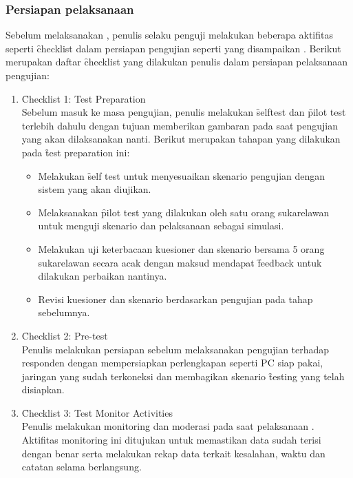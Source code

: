 \subsubsection{Persiapan pelaksanaan \ust}
Sebelum melaksanakan \ust, penulis selaku penguji melakukan beberapa aktifitas seperti \f{checklist} dalam persiapan pengujian seperti yang disampaikan \citet{buku.rubin}. Berikut merupakan daftar \f{checklist} yang dilakukan penulis dalam persiapan pelaksanaan pengujian:
\begin{enumerate}
	\item \f{Checklist 1: Test Preparation}\\
	Sebelum masuk ke masa pengujian, penulis melakukan \f{selftest} dan \f{pilot test} terlebih dahulu dengan tujuan memberikan gambaran pada saat pengujian yang akan dilaksanakan nanti. Berikut merupakan tahapan yang dilakukan pada \f{test preparation} ini:
	\begin{itemize}
		\item Melakukan \f{self test} untuk menyesuaikan skenario pengujian dengan sistem yang akan diujikan.
		\item Melaksanakan \f{pilot test} yang dilakukan oleh satu orang sukarelawan untuk menguji skenario dan pelaksanaan \ust \space sebagai simulasi. 
		\item Melakukan uji keterbacaan kuesioner dan skenario bersama 5 orang sukarelawan secara acak dengan maksud mendapat \f{feedback} untuk dilakukan perbaikan nantinya.
		\item Revisi kuesioner dan skenario berdasarkan pengujian pada tahap sebelumnya.
	\end{itemize}
	\item \f{Checklist 2: Pre-test}\\
	Penulis melakukan persiapan sebelum melaksanakan pengujian terhadap responden dengan mempersiapkan perlengkapan seperti PC siap pakai, jaringan yang sudah terkoneksi dan membagikan skenario \f{testing} yang telah disiapkan.
	\item \f{Checklist 3: Test Monitor Activities}\\
	Penulis melakukan monitoring dan moderasi pada saat pelaksanaan \ust. Aktifitas monitoring ini ditujukan untuk memastikan data sudah terisi dengan benar serta melakukan rekap data terkait kesalahan, waktu dan catatan selama \ust \space berlangsung.
\end{enumerate}
